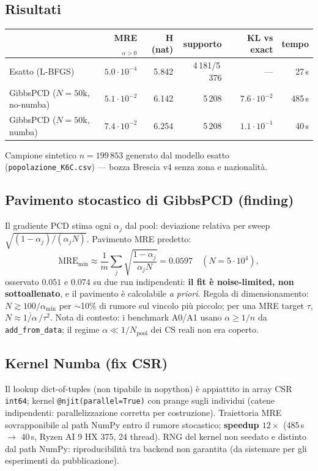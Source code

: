 \documentclass[11pt,a4paper]{article}
\newcommand{\code}[1]{\texttt{#1}}
\begin{document}
\subsection{Risultati}
\begin{center}
\small
\begin{tabular}{@{}lrrrrr@{}}
\toprule
 & \textbf{MRE}$_{\alpha>0}$ & \textbf{H (nat)} & \textbf{supporto} & \textbf{KL vs exact} & \textbf{tempo}\\
\midrule
Esatto (L-BFGS) & $5.0\cdot10^{-4}$ & 5.842 & 4\,181/5\,376 & --- & 27\,s\\
GibbsPCD ($N{=}50$k, no-numba) & $5.1\cdot10^{-2}$ & 6.142 & 5\,208 & $7.6\cdot10^{-2}$ & 485\,s\\
GibbsPCD ($N{=}50$k, numba) & $7.4\cdot10^{-2}$ & 6.254 & 5\,208 & $1.1\cdot10^{-1}$ & 40\,s\\
\bottomrule
\end{tabular}
\end{center}
Campione sintetico $n=199\,853$ generato dal modello esatto
(\code{popolazione\_K6C.csv}) --- bozza Brescia v4 senza zona e nazionalit\`a.

\subsection{Pavimento stocastico di GibbsPCD (finding)}
Il gradiente PCD stima ogni $\alpha_j$ dal pool: deviazione relativa per sweep
$\sqrt{(1-\alpha_j)/(\alpha_j N)}$. Pavimento MRE predetto:
\[
\text{MRE}_{\min} \approx \frac{1}{m}\sum_j \sqrt{\frac{1-\alpha_j}{\alpha_j N}}
 = 0.0597 \quad (N=5\cdot10^4),
\]
osservato $0.051$ e $0.074$ su due run indipendenti: \textbf{il fit \`e
noise-limited, non sottoallenato}, e il pavimento \`e calcolabile
\emph{a priori}. Regola di dimensionamento: $N \gtrsim 100/\alpha_{\min}$ per
$\sim$10\% di rumore sul vincolo pi\`u piccolo; per una MRE target $\tau$,
$N \approx \overline{1/\alpha}\,/\tau^2$. Nota di contesto: i benchmark
A0/A1 usano $\alpha \ge 1/n$ da \code{add\_from\_data}; il regime
$\alpha \ll 1/N_{\text{pool}}$ dei CS reali non era coperto.

\subsection{Kernel Numba (fix CSR)}
Il lookup dict-of-tuples (non tipabile in nopython) \`e appiattito in array CSR
\code{int64}; kernel \code{@njit(parallel=True)} con prange sugli individui
(catene indipendenti: parallelizzazione corretta per costruzione). Traiettoria
MRE sovrapponibile al path NumPy entro il rumore stocastico; \textbf{speedup
$12\times$} (485\,s $\to$ 40\,s, Ryzen AI 9 HX 375, 24 thread). RNG del kernel
non seedato e distinto dal path NumPy: riproducibilit\`a tra backend non
garantita (da sistemare per gli esperimenti da pubblicazione).
\end{document}
